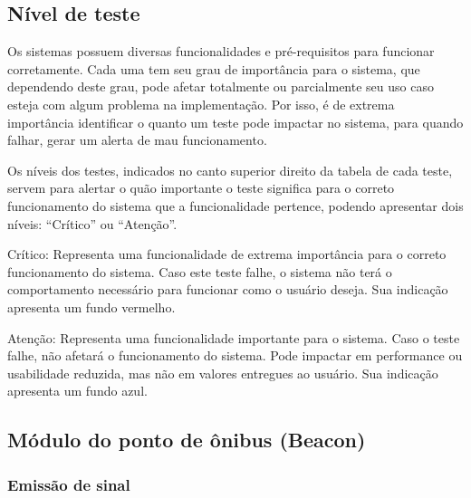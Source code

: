 \documentclass[
	12pt,				%
	oneside,			%
	a4paper,			%
	brazil				%
]{abntex2}
\begin{document}
{\begin{apendicesenv}
\begin{itemize}
\end{itemize}

\newpage

\subsection*{Nível de teste}

Os sistemas possuem diversas funcionalidades e pré-requisitos para funcionar corretamente. Cada uma tem seu grau de importância para o sistema, que dependendo deste grau, pode afetar totalmente ou parcialmente seu uso caso esteja com algum problema na implementação. Por isso, é de extrema importância identificar o quanto um teste pode impactar no sistema, para quando falhar, gerar um alerta de mau funcionamento.

Os níveis dos testes, indicados no canto superior direito da tabela de cada teste, servem para alertar o quão importante o teste significa para o correto funcionamento do sistema que a funcionalidade pertence, podendo apresentar dois níveis: “Crítico” ou “Atenção”.

Crítico: Representa uma funcionalidade de extrema importância para o correto funcionamento do sistema. Caso este teste falhe, o sistema não terá o comportamento necessário para funcionar como o usuário deseja. Sua indicação apresenta um fundo vermelho. 

Atenção: Representa uma funcionalidade importante para o sistema. Caso o teste falhe, não afetará o funcionamento do sistema. Pode impactar em performance ou usabilidade reduzida, mas não em valores entregues ao usuário. Sua indicação apresenta um fundo azul.

\newpage

\subsection*{Módulo do ponto de ônibus (Beacon)}

\subsubsection*{Emissão de sinal}

\bgroup
\def\arraystretch{1.5}

\begin{table}[H]


\end{table}
\end{apendicesenv}}
\end{document}
